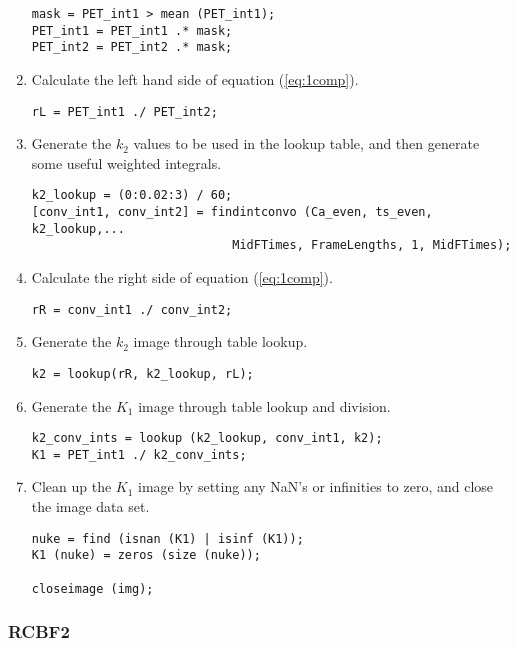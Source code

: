 \begin{enumerate}
\begin{verbatim}
mask = PET_int1 > mean (PET_int1);
PET_int1 = PET_int1 .* mask;
PET_int2 = PET_int2 .* mask;
\end{verbatim}

\item Calculate the left hand side of equation (\ref{eq:1comp}).
\begin{verbatim}
rL = PET_int1 ./ PET_int2;
\end{verbatim}

\item Generate the $k_2$ values to be used in the lookup table, and
then generate some useful weighted integrals.
\begin{verbatim}
k2_lookup = (0:0.02:3) / 60;
[conv_int1, conv_int2] = findintconvo (Ca_even, ts_even, k2_lookup,...
                            MidFTimes, FrameLengths, 1, MidFTimes);
\end{verbatim}

\item Calculate the right side of equation (\ref{eq:1comp}).
\begin{verbatim}
rR = conv_int1 ./ conv_int2;
\end{verbatim}

\item Generate the $k_2$ image through table lookup.
\begin{verbatim}
k2 = lookup(rR, k2_lookup, rL);
\end{verbatim}

\item Generate the $K_1$ image through table lookup and division.
\begin{verbatim}
k2_conv_ints = lookup (k2_lookup, conv_int1, k2);
K1 = PET_int1 ./ k2_conv_ints;
\end{verbatim}

\item Clean up the $K_1$ image by setting any NaN's or infinities to
zero, and close the image data set.
\begin{verbatim}
nuke = find (isnan (K1) | isinf (K1));
K1 (nuke) = zeros (size (nuke));

closeimage (img);
\end{verbatim}
\end{enumerate}


\subsubsection{RCBF2}

